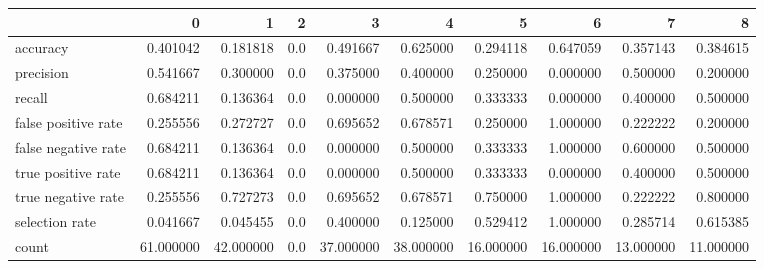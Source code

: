 \begin{tabular}{lrrrrrrrrr}
\toprule
{} &          0 &          1 &    2 &          3 &          4 &          5 &          6 &          7 &          8 \\
\midrule
accuracy            &   0.401042 &   0.181818 &  0.0 &   0.491667 &   0.625000 &   0.294118 &   0.647059 &   0.357143 &   0.384615 \\
precision           &   0.541667 &   0.300000 &  0.0 &   0.375000 &   0.400000 &   0.250000 &   0.000000 &   0.500000 &   0.200000 \\
recall              &   0.684211 &   0.136364 &  0.0 &   0.000000 &   0.500000 &   0.333333 &   0.000000 &   0.400000 &   0.500000 \\
false positive rate &   0.255556 &   0.272727 &  0.0 &   0.695652 &   0.678571 &   0.250000 &   1.000000 &   0.222222 &   0.200000 \\
false negative rate &   0.684211 &   0.136364 &  0.0 &   0.000000 &   0.500000 &   0.333333 &   1.000000 &   0.600000 &   0.500000 \\
true positive rate  &   0.684211 &   0.136364 &  0.0 &   0.000000 &   0.500000 &   0.333333 &   0.000000 &   0.400000 &   0.500000 \\
true negative rate  &   0.255556 &   0.727273 &  0.0 &   0.695652 &   0.678571 &   0.750000 &   1.000000 &   0.222222 &   0.800000 \\
selection rate      &   0.041667 &   0.045455 &  0.0 &   0.400000 &   0.125000 &   0.529412 &   1.000000 &   0.285714 &   0.615385 \\
count               &  61.000000 &  42.000000 &  0.0 &  37.000000 &  38.000000 &  16.000000 &  16.000000 &  13.000000 &  11.000000 \\
\bottomrule
\end{tabular}

